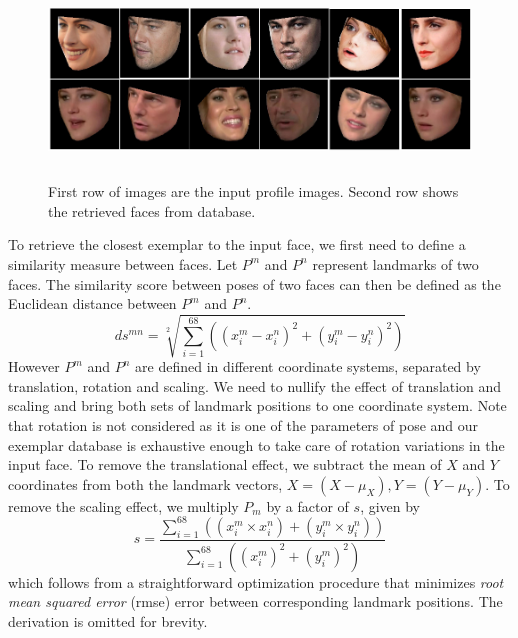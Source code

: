 \begin{figure}
\centering
\includegraphics[width =15cm,height=5.2cm]{front/figures/test_exemplar_map.png}
\caption{First row of images are the input profile images. Second row shows the retrieved faces from database.}
\label{fig:test_exemplar_map}
\end{figure}

To retrieve the closest exemplar to the input face, we first need to define a similarity measure between
faces. Let $P^m$ and $P^n$ represent landmarks of two faces. The similarity score between poses of
two faces can then be defined as the Euclidean distance between $P^m$ and $P^n$.
\begin{equation}
    ds^{mn} = \sqrt[2]{\sum_{i=1}^{68}((x_i^m - x_i^n)^2+(y_i^m - y_i^n)^2)} \label{eq:dissimilarity_score}
\end{equation}
However $P^m$ and $P^n$ are defined in different coordinate systems, separated by translation,
rotation and scaling. We need to nullify the effect
of translation and scaling and bring both sets of landmark positions to one coordinate system. 
Note that rotation is not considered as it is one of the parameters of pose and our exemplar database is
exhaustive enough to take care of rotation variations in the input face.
To remove the translational effect, we subtract the mean of $X$ and $Y$ coordinates from both the landmark vectors,
  $X = (X - \mu_X), Y = (Y - \mu_Y)$.
To remove the scaling effect, we multiply $P_m$ by a factor of $s$, given by
\begin{equation}
  s = \frac{\sum_{i=1}^{68}((x_{i}^{m} \times x_{i}^{n})+(y_{i}^{m} \times y_{i}^{n})) }{\sum_{i=1}^{68}((x_{i}^m)^2 + (y_{i}^{m})^2)}  \label{eq:scaling_effect}
\end{equation}
which follows from a straightforward optimization procedure that minimizes \emph{root mean squared
error} (rmse) error between corresponding landmark positions. The derivation is omitted for brevity.

